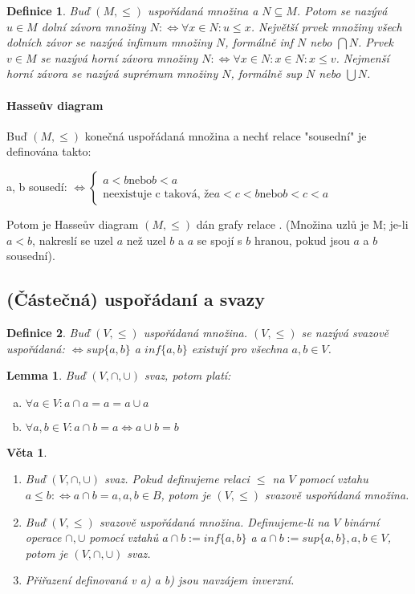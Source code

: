 \documentclass[a4paper, 11pt]{report}
\newtheorem{mydef}{Definice}[chapter]
\newtheorem{veta}{Věta}[chapter]
\newtheorem{lemma}{Lemma}[chapter]
\begin{document}
\begin{mydef}
Buď $(M, \leq)$ uspořádaná množina a $N \subseteq M$. Potom se nazývá $u \in M$ dolní závora množiny $N : \Leftrightarrow \forall x \in N: u \leq x$. Největší prvek množiny všech dolních závor se nazývá \emph{infimum} množiny $N$, formálně inf $N$ nebo $\bigcap N$. Prvek $v \in M$ se nazývá horní závora množiny $N: \Leftrightarrow \forall x \in N: x \in N: x \leq v$. Nejmenší horní závora se nazývá suprémum množiny $N$, formálně sup $N$ nebo $\bigcup N$.
\end{mydef}

\paragraph{Hasseův diagram} Buď $(M, \leq)$ konečná uspořádaná množina a nechť relace "sousední" je definována takto:

a, b sousedí: $\Leftrightarrow \begin{cases}
a < b \text{nebo} b < a \\
\text{neexistuje c taková, že} a < c < b \text{nebo} b < c < a
\end{cases}$

Potom je Hasseův diagram $(M, \leq)$ dán grafy relace . (Množina uzlů je M; je-li $a < b$, nakreslí se uzel $a$  než uzel $b$ a $a$ se spojí s $b$ hranou, pokud jsou $a$ a $b$ sousední).

\subsection{(Částečná) uspořádaní a svazy}
\begin{mydef}
Buď $(V, \leq)$ uspořádaná množina. $(V, \leq)$ se nazývá svazově uspořádaná: $\Leftrightarrow sup\{a, b\}$ a $inf\{a, b\}$ existují pro všechna $a, b \in V$.
\end{mydef}

\begin{lemma}
Buď $(V, \cap, \cup)$ svaz, potom platí:
\begin{enumerate}[a)]
	\item $\forall a \in V: a \cap a = a = a \cup a$
	\item $\forall a, b \in V: a \cap b = a \Leftrightarrow a \cup b = b$
\end{enumerate}
\end{lemma}

\begin{veta}
\begin{enumerate}
	\item Buď $(V, \cap, \cup)$ svaz. Pokud definujeme relaci $\leq$ na $V$ pomocí vztahu $a \leq b: \Leftrightarrow a \cap b = a, a,b \in B$, potom je $(V, \leq)$ svazově uspořádaná množina.
	\item Buď $(V, \leq)$ svazově uspořádaná množina. Definujeme-li na $V$ binární operace $\cap, \cup$ pomocí vztahů $a \cap b := inf\{a, b\}$ a $a \cap b := sup\{a, b\}, a, b \in V$, potom je $(V, \cap, \cup)$ svaz.
	\item Přiřazení definovaná v a) a b) jsou navzájem inverzní.
\end{enumerate}
\end{veta}
\end{document}
